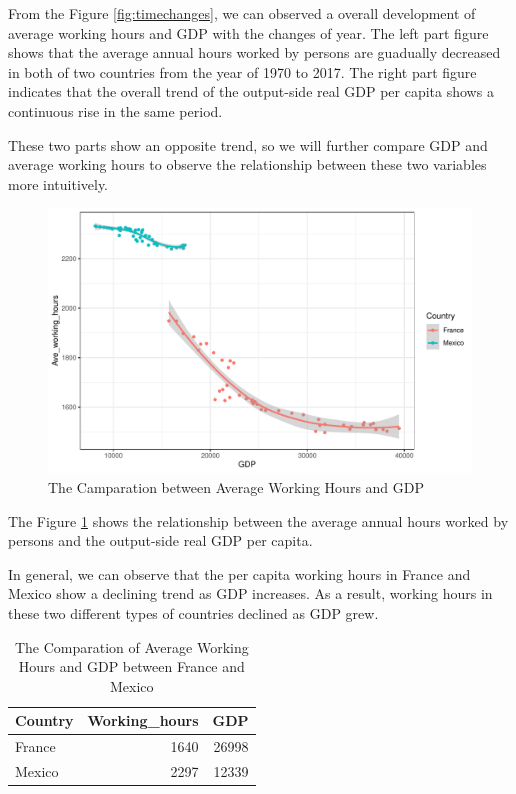 \documentclass[11pt,a4paper,]{article}
\begin{document}
From the Figure \ref{fig:timechanges}, we can observed a overall development of average working hours and GDP with the changes of year. The left part figure shows that the average annual hours worked by persons are guadually decreased in both of two countries from the year of 1970 to 2017. The right part figure indicates that the overall trend of the output-side real GDP per capita shows a continuous rise in the same period.

These two parts show an opposite trend, so we will further compare GDP and average working hours to observe the relationship between these two variables more intuitively.

\begin{figure}

{\centering \includegraphics{report_files/figure-latex/relationship-1} 

}

\caption{The Camparation between Average Working Hours and GDP}\label{fig:relationship}
\end{figure}

The Figure \ref{fig:relationship} shows the relationship between the average annual hours worked by persons and the output-side real GDP per capita.

In general, we can observe that the per capita working hours in France and Mexico show a declining trend as GDP increases. As a result, working hours in these two different types of countries declined as GDP grew.

\clearpage

\begin{table}

\caption{\label{tab:comparation}The Comparation of Average Working Hours and GDP between France and Mexico}
\centering
\begin{tabular}[t]{lrr}
\toprule
Country & Working\_hours & GDP\\
\midrule
France & 1640 & 26998\\
Mexico & 2297 & 12339\\
\bottomrule
\end{tabular}
\end{table}
\end{document}

